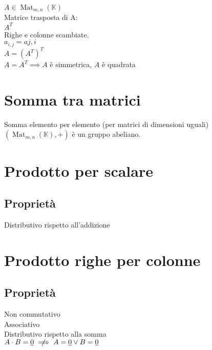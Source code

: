 \documentclass[a4paper, twoside, italian, 11pt]{book}
\DeclareMathOperator{\Mat}{Mat}
\newcommand{\K}{\mathbb K}
\begin{document}
$A \in \Mat_{m,n}(\K)$ \\

\noindent
Matrice trasposta di A: \\
$A^T$ \\

\noindent
Righe e colonne scambiate. \\
$a_{i,j} = a{j,i}$ \\

\noindent
$A = (A^T)^T$ \\

\noindent
$A = A^T \implies A$ è simmetrica, $A$ è quadrata



\section{Somma tra matrici}

Somma elemento per elemento (per matrici di dimensioni uguali) \\

\noindent
$(\Mat_{m,n}(\K), +)$ è un gruppo abeliano.



\section{Prodotto per scalare}



\subsection{Proprietà}

Distributivo rispetto all'addizione



\section{Prodotto righe per colonne}



\subsection{Proprietà}

Non commutativo \\
Associativo \\
Distributivo rispetto alla somma \\

\noindent
$A \cdot B = \underline{0} \centernot\implies A = \underline{0} \lor B = \underline{0}$ \\
\end{document}
